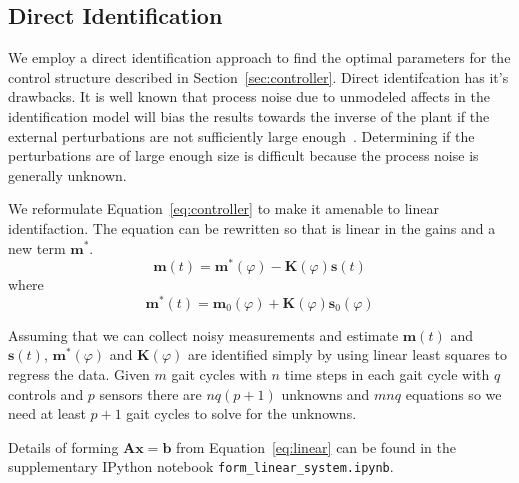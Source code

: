 \documentclass{article}
\begin{document}
\subsection*{Direct Identification}
%
We employ a direct identification approach to find the optimal parameters for
the control structure described in Section~\ref{sec:controller}. Direct
identifcation has it's drawbacks. It is well known that process noise due to
unmodeled affects in the identification model will bias the results towards the
inverse of the plant if the external perturbations are not sufficiently large
enough~\cite{Ljung1999,Kearney1990,Kooij2005}. Determining if the perturbations
are of large enough size is difficult because the process noise is generally
unknown.


We reformulate Equation~\ref{eq:controller} to make it amenable to linear
identifaction. The equation can be rewritten so that is linear in the gains and
a new term $\mathbf{m}^*$.
%
\begin{equation}
  \mathbf{m}(t) = \mathbf{m}^*(\varphi) - \mathbf{K}(\varphi) \mathbf{s}(t)
\end{equation}
%
where
%
\begin{equation}
  \mathbf{m}^*(t) = \mathbf{m}_0(\varphi) + \mathbf{K}(\varphi) \mathbf{s}_0(\varphi)
\end{equation}

Assuming that we can collect noisy measurements and estimate $\mathbf{m}(t)$
and $\mathbf{s}(t)$, $\mathbf{m}^*(\varphi)$ and $\mathbf{K}(\varphi)$ are
identified simply by using linear least squares to regress the data. Given $m$
gait cycles with $n$ time steps in each gait cycle with $q$ controls and $p$
sensors there are $nq(p + 1)$ unknowns and $mnq$ equations so we need at least
$p + 1$ gait cycles to solve for the unknowns.

Details of forming $\mathbf{Ax}=\mathbf{b}$ from Equation~\ref{eq:linear} can
be found in the supplementary IPython notebook \verb|form_linear_system.ipynb|.
\end{document}
